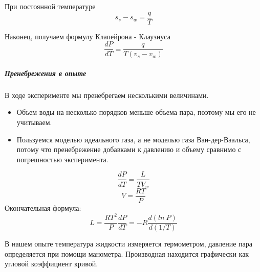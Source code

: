 \documentclass[12pt]{article}
\begin{document}
		При постоянной температуре
		\begin{equation}
		s_s - s_w = \dfrac{q}{T}
		\end{equation}
		
		Наконец, получаем формулу Клапейрона - Клаузиуса
		\begin{equation}
		\dfrac{dP}{dT} = \dfrac{q}{T(v_s- v_w)}
		\end{equation}
		
		\subparagraph{Пренебрежения в опыте}
		В ходе эксперименте мы пренебрегаем несколькими величинами.
		\begin{itemize}
			\item Объем воды на несколько порядков меньше объема пара, поэтому мы его не учитываем.
			\item Пользуемся моделью идеального газа, а не моделью газа Ван-дер-Ваальса, потому что пренебрежение добавками к давлению и объему сравнимо с погрешностью эксперимента.
		\end{itemize}
		
		\begin{equation}
		\dfrac{dP}{dT} = \dfrac{L}{TV_w}
		\end{equation}
		\begin{equation*}
		V = \dfrac{RT}{P}
		\end{equation*}
		Окончательная формула:
		\begin{equation}\label{eq:final}
		L=\dfrac{RT^2}{P}\dfrac{dP}{dT}=-R\dfrac{d(ln\ P)}{d(1/T)}
		\end{equation}
		
		В нашем опыте температура жидкости измеряется термометром, давление пара определяется при помощи манометра. Производная находится графически как угловой коэффициент кривой.
\end{document}
